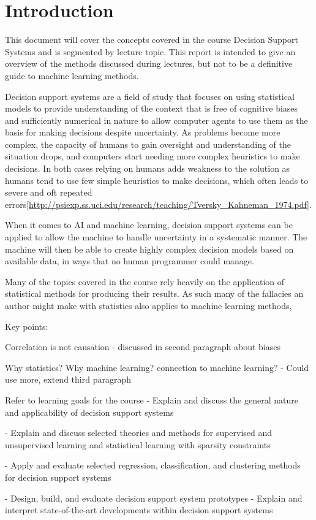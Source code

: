 \chapter{Introduction} \label{ch:introduction}

This document will cover the concepts covered in the course Decision Support Systems and is segmented by lecture topic. This report is intended to give an overview of the methods discussed during lectures, but not to be a definitive guide to machine learning methods.

Decision support systems are a field of study that focuses on using statistical models to provide understanding of the context that is free of cognitive biases and sufficiently numerical in nature to allow computer agents to use them as the basis for making decisions despite uncertainty. As problems become more complex, the capacity of humans to gain oversight and understanding of the situation drops, and computers start needing more complex heuristics to make decisions. In both cases relying on humans adds weakness to the solution as humans tend to use few simple heuristics to make decisions, which often leads to severe and oft repeated errors\ref{http://psiexp.ss.uci.edu/research/teaching/Tversky_Kahneman_1974.pdf}.

When it comes to AI and machine learning, decision support systems can be applied to allow the machine to handle uncertainty in a systematic manner. The machine will then be able to create highly complex decision models based on available data, in ways that no human programmer could manage.

Many of the topics covered in the course rely heavily on the application of statistical methods for producing their results. As such many of the fallacies an author might make with statistics also applies to machine learning methods, 

Key points:

Correlation is not causation
    - discussed in second paragraph about biases

Why statistics?
    Why machine learning? connection to machine learning?
    - Could use more, extend third paragraph

Refer to learning goals for the course
    - Explain and discuss the general nature and applicability of decision support systems

    - Explain and discuss selected theories and methods for supervised and unsupervised learning and statistical learning with sparsity constraints

    - Apply and evaluate selected regression, classification, and clustering methods for decision support systems

    - Design, build, and evaluate decision support system prototypes
    - Explain and interpret state-of-the-art developments within decision support systems

